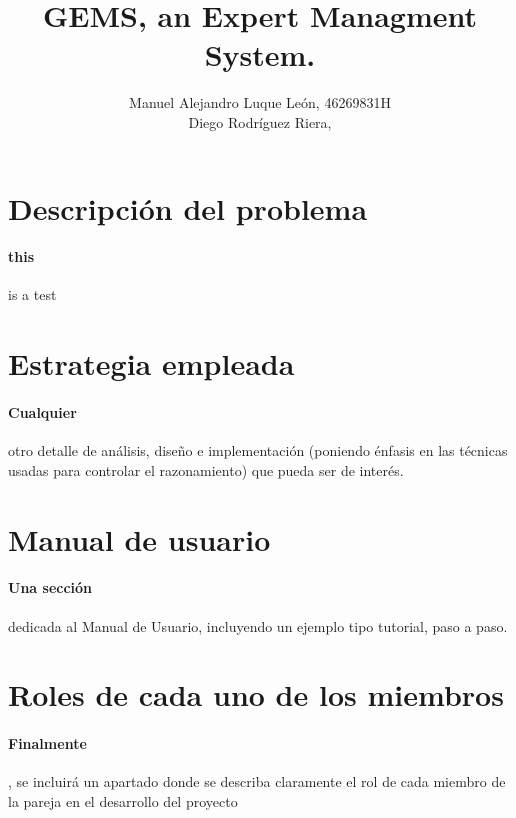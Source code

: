\documentclass[a4paper,10pt]{article}
\title{GEMS, an Expert Managment System.}
\author{Manuel Alejandro Luque León, 46269831H\\Diego Rodríguez Riera, }
\begin{document}
\maketitle
\pagebreak
\tableofcontents
\pagebreak

\section{Descripción del problema}
\paragraph{this}is a test
\pagebreak

\section{Estrategia empleada}
\paragraph{Cualquier} otro detalle de análisis, diseño e implementación (poniendo énfasis en las técnicas usadas para controlar el razonamiento) que pueda ser de interés.
\pagebreak

\section{Manual de usuario}
\paragraph{Una sección} dedicada al Manual de Usuario, incluyendo un ejemplo tipo tutorial, paso a paso.
\pagebreak

\section{Roles de cada uno de los miembros}
\paragraph{Finalmente}, se incluirá un apartado donde se describa claramente el rol de cada miembro de la pareja en el desarrollo del proyecto
\pagebreak

\nocite{*}



\end{document}
